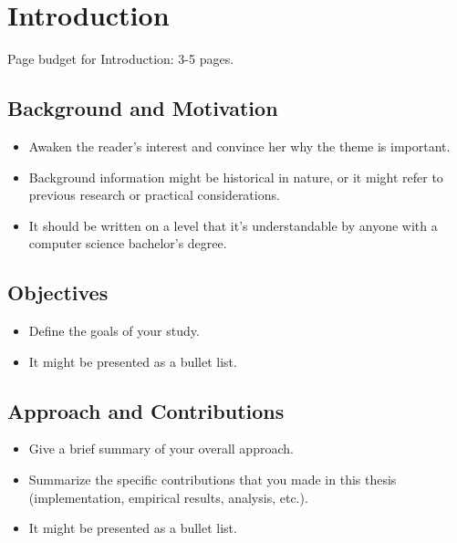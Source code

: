 
\chapter{Introduction}
\label{ch:intro}

\begin{instructions}
Page budget for Introduction: 3-5 pages.
\end{instructions}


\section{Background and Motivation}
\label{sec:motivation}

\begin{instructions}
\begin{itemize}
\item Awaken the reader's interest and convince her why the theme is important.
\item Background information might be historical in nature, or it might refer to previous research or practical considerations.
\item It should be written on a level that it's understandable by anyone with a computer science bachelor's degree.
\end{itemize}
\end{instructions}


\section{Objectives}

\begin{instructions}
\begin{itemize}
\item Define the goals of your study. 
\item It might be presented as a bullet list.
\end{itemize}
\end{instructions}


\section{Approach and Contributions}

\begin{instructions}
\begin{itemize}
\item Give a brief summary of your overall approach.
\item Summarize the specific contributions that you made in this thesis (implementation, empirical results, analysis, etc.).
\item It might be presented as a bullet list.
\end{itemize}
\end{instructions}


